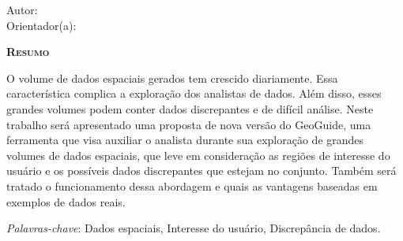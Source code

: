 \begin{center}
	{\Large{\textbf{\thesistitle}}}
\end{center}

\vspace{1cm}

\begin{flushright}
	Autor: \thesisauthor\\
	Orientador(a): \thesissupervisor
\end{flushright}

\vspace{1cm}

\begin{center}
	\Large{\textsc{\textbf{Resumo}}}
\end{center}

\noindent O volume de dados espaciais gerados tem crescido diariamente. Essa característica complica a exploração dos analistas de dados. Além disso, esses grandes volumes podem conter dados discrepantes e de difícil análise. Neste trabalho será apresentado uma proposta de nova versão do GeoGuide, uma ferramenta que visa auxiliar o analista durante sua exploração de grandes volumes de dados espaciais, que leve em consideração as regiões de interesse do usuário e os possíveis dados discrepantes que estejam no conjunto. Também será tratado o funcionamento dessa abordagem e quais as vantagens baseadas em exemplos de dados reais.

\noindent\textit{Palavras-chave}: Dados espaciais, Interesse do usuário, Discrepância de dados.